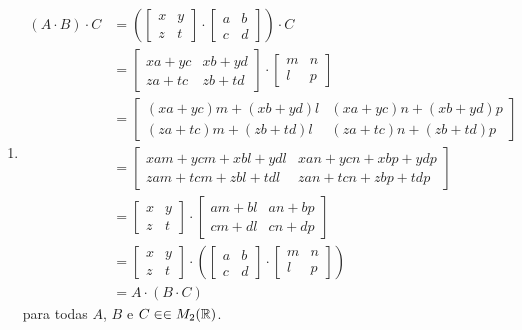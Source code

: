 \documentclass[12pt]{exam}
\begin{document}
\begin{enumerate}[label={\roman*})]
    \item
    \begin{align*}
        (A\cdot B)\cdot C &= \left(\begin{bmatrix}
        x & y\\z & t 
    \end{bmatrix} \cdot \begin{bmatrix}
        a & b\\c & d 
    \end{bmatrix}\right) \cdot C\\ &= \begin{bmatrix}
        xa + yc & xb + yd\\za + tc & zb + td 
    \end{bmatrix} \cdot \begin{bmatrix}
        m & n\\
        l & p
    \end{bmatrix}\\ &= \begin{bmatrix}
        (xa + yc)m + (xb + yd)l & (xa + yc)n + (xb + yd)p\\
        (za + tc)m + (zb + td)l & (za + tc)n + (zb + td)p
    \end{bmatrix}\\ &= \begin{bmatrix}
        xam + ycm + xbl + ydl & xan + ycn + xbp + ydp\\
        zam + tcm + zbl + tdl & zan + tcn + zbp + tdp
    \end{bmatrix}\\ &= \begin{bmatrix}
        x & y\\z & t 
    \end{bmatrix} \cdot \begin{bmatrix}
        am + bl & an + bp\\cm + dl & cn + dp 
    \end{bmatrix}\\ &= \begin{bmatrix}
        x & y\\z & t 
    \end{bmatrix} \cdot \left(\begin{bmatrix}
        a & b\\
        c & d
    \end{bmatrix}\cdot \begin{bmatrix}
        m & n\\
        l & p
    \end{bmatrix}\right)\\ &= A\cdot (B \cdot C)
    \end{align*}
    para todas $A$, $B$ e $C \in \in M_2(\mathbb{R})$.


\end{enumerate}
\end{document}
